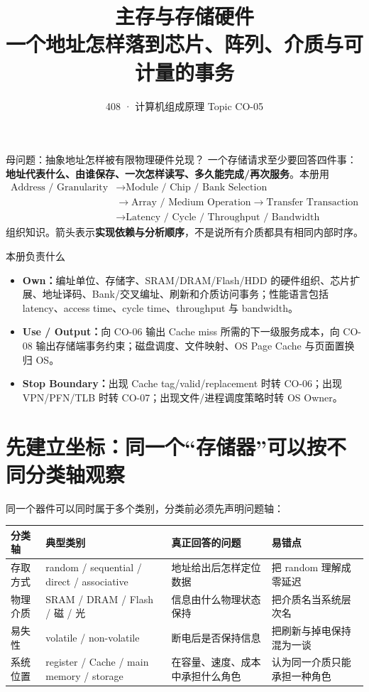\documentclass[UTF8,fontset=fandol,11pt,a4paper]{ctexart}
\title{\vspace{-1.1cm}\textbf{主存与存储硬件}\\[0.4em]\large 一个地址怎样落到芯片、阵列、介质与可计量的事务}
\author{408 · 计算机组成原理 Topic CO-05}\date{}
\newcommand{\kw}[1]{\textbf{\color{deep}#1}}\newcommand{\code}[1]{\texttt{#1}}
\begin{document}
\maketitle

\begin{corebox}{母问题：抽象地址怎样被有限物理硬件兑现？}
一个存储请求至少要回答四件事：\textbf{地址代表什么、由谁保存、一次怎样读写、多久能完成/再次服务}。本册用
\[
\boxed{
\begin{aligned}
\text{Address / Granularity}
&\to\text{Module / Chip / Bank Selection}\\
&\to\text{Array / Medium Operation}
\to\text{Transfer Transaction}\\
&\to\text{Latency / Cycle / Throughput / Bandwidth}
\end{aligned}}
\]
组织知识。箭头表示\textbf{实现依赖与分析顺序}，不是说所有介质都具有相同内部时序。
\end{corebox}

\begin{methodbox}{本册负责什么}
\begin{itemize}
\item \kw{Own：}编址单位、存储字、SRAM/DRAM/Flash/HDD 的硬件组织、芯片扩展、地址译码、Bank/交叉编址、刷新和介质访问事务；性能语言包括 latency、access time、cycle time、throughput 与 bandwidth。
\item \kw{Use / Output：}向 CO-06 输出 Cache miss 所需的下一级服务成本，向 CO-08 输出存储端事务约束；磁盘调度、文件映射、OS Page Cache 与页面置换归 OS。
\item \kw{Stop Boundary：}出现 Cache tag/valid/replacement 时转 CO-06；出现 VPN/PFN/TLB 时转 CO-07；出现文件/进程调度策略时转 OS Owner。
\end{itemize}
\end{methodbox}

\tableofcontents\newpage

\section{先建立坐标：同一个“存储器”可以按不同分类轴观察}
同一个器件可以同时属于多个类别，分类前必须先声明问题轴：
\begin{center}\small
\begin{tabularx}{\linewidth}{L{2.5cm}L{3cm}YY}
\toprule
分类轴 & 典型类别 & 真正回答的问题 & 易错点\\\midrule
存取方式 & random / sequential / direct / associative & 地址给出后怎样定位数据 & 把 random 理解成零延迟\\
物理介质 & SRAM / DRAM / Flash / 磁 / 光 & 信息由什么物理状态保持 & 把介质名当系统层次名\\
易失性 & volatile / non-volatile & 断电后是否保持信息 & 把刷新与掉电保持混为一谈\\
系统位置 & register / Cache / main memory / storage & 在容量、速度、成本中承担什么角色 & 认为同一介质只能承担一种角色\\
\bottomrule
\end{tabularx}
\end{center}
\end{document}
